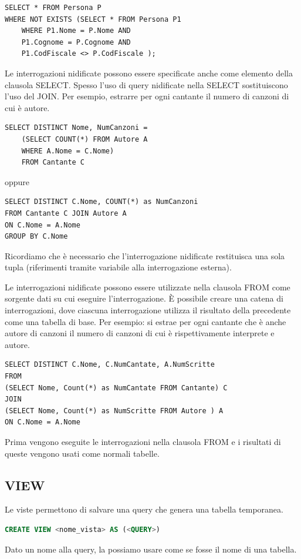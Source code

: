 \documentclass[a4paper]{article}
\begin{document}
\begin{verbatim}
SELECT * FROM Persona P
WHERE NOT EXISTS (SELECT * FROM Persona P1
    WHERE P1.Nome = P.Nome AND
    P1.Cognome = P.Cognome AND
    P1.CodFiscale <> P.CodFiscale );
\end{verbatim}
\noindent
Le interrogazioni nidificate possono essere specificate anche come
elemento della clausola SELECT.
Spesso l’uso di query nidificate nella SELECT sostituiscono l’uso del JOIN.
Per esempio, estrarre per ogni cantante il numero di canzoni di cui è autore.
\begin{verbatim}
SELECT DISTINCT Nome, NumCanzoni =
    (SELECT COUNT(*) FROM Autore A
    WHERE A.Nome = C.Nome)
    FROM Cantante C
\end{verbatim}
\noindent
oppure
\begin{verbatim}
SELECT DISTINCT C.Nome, COUNT(*) as NumCanzoni
FROM Cantante C JOIN Autore A
ON C.Nome = A.Nome
GROUP BY C.Nome
\end{verbatim}

\begin{Observation}{}{}
Ricordiamo che è necessario che l’interrogazione nidificate restituisca una
sola tupla (riferimenti tramite variabile alla interrogazione esterna).
\end{Observation}
\noindent
Le interrogazioni nidificate possono essere utilizzate nella
clausola FROM come sorgente dati su cui eseguire
l’interrogazione. È possibile creare una catena di interrogazioni, dove ciascuna
interrogazione utilizza il risultato della precedente come una
tabella di base.
Per esempio: si estrae per ogni cantante che è anche autore di canzoni il numero
di canzoni di cui è rispettivamente interprete e autore.
\begin{verbatim}
SELECT DISTINCT C.Nome, C.NumCantate, A.NumScritte
FROM
(SELECT Nome, Count(*) as NumCantate FROM Cantante) C
JOIN
(SELECT Nome, Count(*) as NumScritte FROM Autore ) A
ON C.Nome = A.Nome
\end{verbatim}
\noindent
Prima vengono eseguite le interrogazioni nella clausola FROM e i
risultati di queste vengono usati come normali tabelle.

\subsection{VIEW}

Le viste permettono di salvare una query che genera una tabella temporanea.

\begin{lstlisting}[language=SQL]
CREATE VIEW <nome_vista> AS (<QUERY>)
\end{lstlisting}
\noindent
Dato un nome alla query, la possiamo usare come se fosse il nome di una tabella.
\end{document}
